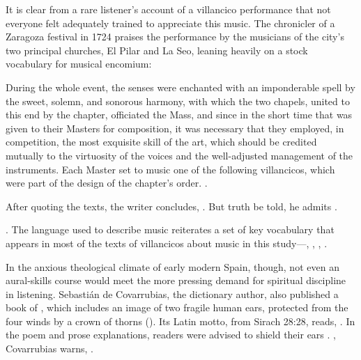 It is clear from a rare listener's account of a villancico performance that not
everyone felt adequately trained to appreciate this music.
The chronicler of a Zaragoza festival in 1724 praises the performance by the
musicians of the city's two principal churches, El Pilar and La Seo, leaning
heavily on a stock vocabulary for musical encomium: 
\begin{quoting}
    During the whole event, the senses were enchanted with an imponderable
    spell by the sweet, solemn, and sonorous harmony, with which the two
    chapels, united to this end by the chapter, officiated the Mass, and since
    in the short time that was given to their Masters for composition, it was
    necessary that they employed, in competition, the most exquisite skill of
    the art, which should be credited mutually to the virtuosity of the voices
    and the well-adjusted management of the instruments.  
    Each Master set to music one of the following villancicos, which were part
    of the design of the chapter's order.%
        \Autocite[97]{Zaragoza1724Relacion}.
\end{quoting}
After quoting the texts, the writer concludes, .
But truth be told, he admits .%
\begin{Footnote}
    \Autocite[97]{Zaragoza1724Relacion}.
    The language used to describe music reiterates a set of key vocabulary that
    appears in most of the texts of villancicos about music in this
    study---, ,
    , .
\end{Footnote}
In the anxious theological climate of early modern Spain, though, not even an
aural-skills course would meet the more pressing demand for spiritual discipline
in listening.
Sebastián de Covarrubias, the dictionary author, also published a book of
, which includes an image of two fragile human ears,
protected from the four winds by a crown of thorns
().%
    \Autocite[202]{Covarrubias:Emblemas}
Its Latin motto, from Sirach 28:28, reads, .
In the poem and prose explanations, readers were advised to shield their ears
.%
    \Autocite[203]{Covarrubias:Emblemas}
, Covarrubias warns, .%
    \Autocite[202]{Covarrubias:Emblemas}

